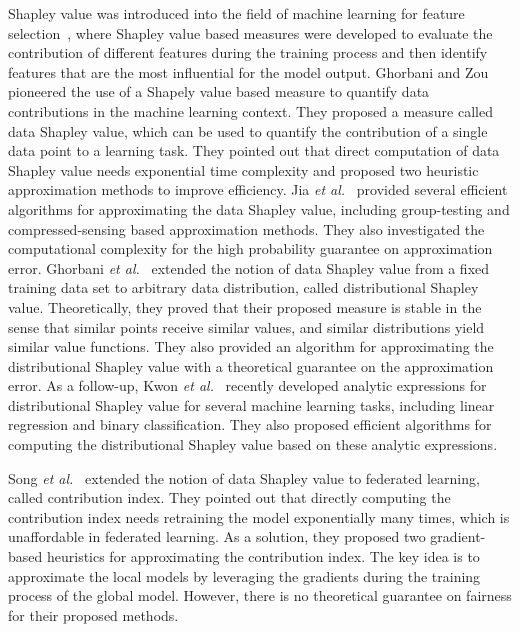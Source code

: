 Shapley value was introduced into the field of machine learning for feature selection~\cite{cohen2005feature, lundberg2017unified,strumbelj2010efficient}, where Shapley value based measures were developed to evaluate the contribution of different features during the training process and then identify features that are the most influential for the model output. Ghorbani and Zou~\cite{ghorbani2019data} pioneered the use of a Shapely value based measure to quantify data contributions in the machine learning context. They proposed a measure called data Shapley value, which can be used to quantify the contribution of a single data point to a learning task. They pointed out that direct computation of data Shapley value needs exponential time complexity and proposed two heuristic approximation methods to improve efficiency. Jia \textit{et al.}~\cite{jia2019towards} provided several efficient algorithms for approximating the data Shapley value, including group-testing and compressed-sensing based approximation methods. They also investigated the computational complexity for the high probability guarantee on approximation error. Ghorbani \textit{et al.}~\cite{ghorbani2020distributional} extended the notion of data Shapley value from a fixed training data set to arbitrary data distribution, called distributional Shapley value. Theoretically, they proved that their proposed measure is stable in the sense that similar points receive similar values, and similar distributions yield similar value functions. They also provided an algorithm for approximating the distributional Shapley value with a theoretical guarantee on the approximation error. As a follow-up,  Kwon \textit{et al.}~\cite{kwon2021efficient} recently developed analytic expressions for distributional Shapley value for several machine learning tasks, including linear regression and binary classification. They also proposed efficient algorithms for computing the distributional Shapley value based on these analytic expressions. 

Song \textit{et al.}~\cite{song2019profit} extended the notion of data Shapley value to federated learning, called contribution index. They pointed out that directly computing the contribution index needs retraining the model exponentially many times, which is unaffordable in federated learning. As a solution, they proposed two gradient-based heuristics for approximating the contribution index. The key idea is to approximate the local models by leveraging the gradients during the training process of the global model. However, there is no theoretical guarantee on fairness for their proposed methods. 

